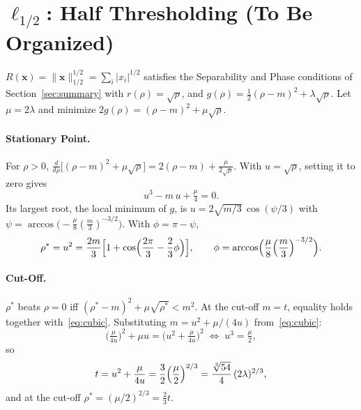 \documentclass[11pt,a4paper]{article}
\theoremstyle{definition}
\begin{document}

\section{$\ell_{1/2}$: Half Thresholding (To Be Organized)}

$R(\mathbf x) = \lVert\mathbf x\rVert_{1/2}^{1/2} = \sum_i |x_i|^{1/2}$ satisfies the Separability and Phase conditions of Section~\ref{sec:summary} with $r(\rho) = \sqrt\rho$, and
$g(\rho) = \tfrac12(\rho-m)^2 + \lambda\sqrt\rho$. Let $\mu = 2\lambda$ and minimize
$2g(\rho) = (\rho-m)^2 + \mu\sqrt\rho$.

\paragraph{Stationary Point.}
For $\rho>0$, $\tfrac{d}{d\rho}\bigl[(\rho-m)^2+\mu\sqrt\rho\bigr] = 2(\rho-m)+\tfrac{\mu}{2\sqrt\rho}$.
With $u=\sqrt\rho$, setting it to zero gives
\begin{equation}\label{eq:cubic}
  u^3 - m\,u + \tfrac{\mu}{4} = 0 .
\end{equation}
Its largest root, the local minimum of $g$, is
$u = 2\sqrt{m/3}\,\cos(\psi/3)$ with $\psi = \arccos\bigl(-\tfrac{\mu}{8}(\tfrac m3)^{-3/2}\bigr)$.
With $\phi = \pi-\psi$,
\begin{equation}\label{eq:half-rho}
  \rho^\ast = u^2 = \frac{2m}{3}\Bigl[1+\cos\Bigl(\frac{2\pi}{3}-\frac{2}{3}\phi\Bigr)\Bigr],
  \qquad \phi = \arccos\Bigl(\frac{\mu}{8}\Bigl(\frac m3\Bigr)^{-3/2}\Bigr).
\end{equation}

\paragraph{Cut-Off.}
$\rho^\ast$ beats $\rho=0$ iff $(\rho^\ast-m)^2+\mu\sqrt{\rho^\ast} < m^2$. At the cut-off $m=t$,
equality holds together with~\eqref{eq:cubic}. Substituting $m = u^2+\mu/(4u)$ from~\eqref{eq:cubic}:
\[
  \bigl(\tfrac{\mu}{4u}\bigr)^2 + \mu u = \bigl(u^2+\tfrac{\mu}{4u}\bigr)^2
  \;\Longleftrightarrow\; u^3 = \tfrac{\mu}{2},
\]
so
\begin{equation}\label{eq:half-t}
  t = u^2+\frac{\mu}{4u} = \frac32\Bigl(\frac{\mu}{2}\Bigr)^{2/3}
  = \frac{\sqrt[3]{54}}{4}\,(2\lambda)^{2/3},
\end{equation}
and at the cut-off $\rho^\ast = (\mu/2)^{2/3} = \tfrac23 t$.
\end{document}
